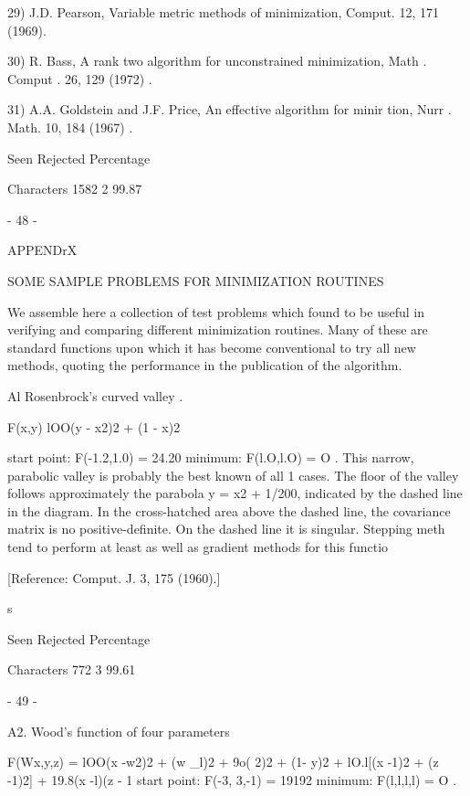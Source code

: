 29) J.D. Pearson, Variable metric methods of minimization, Comput.
        12, 171 (1969).
 
30) R. Bass, A rank two algorithm for unconstrained minimization,
        Math . Comput . 26, 129 (1972) .
 
31) A.A. Goldstein and J.F. Price, An effective algorithm for minir
        tion, Nurr . Math. 10, 184 (1967) .
 
                 Seen Rejected  Percentage
 
Characters       1582        2   99.87
 
                                - 48 -
 
 
APPENDrX
 
 
           SOME SAMPLE PROBLEMS FOR MINIMIZATION ROUTINES
 
 
     We assemble here a collection of test problems which found to be
useful in verifying and comparing different minimization routines.
Many of these are standard functions upon which it has become
conventional to try all new methods, quoting the performance in the
publication of the algorithm.
 
 
Al   Rosenbrock's curved valley
  .
 
 
                  F(x,y)  lOO(y - x2)2 + (1 - x)2
 
start point:              F(-1.2,1.0) = 24.20
minimum:                  F(l.O,l.O)  = O .
     This narrow, parabolic valley is probably the best known of all 1
cases.  The floor of the valley follows approximately the parabola
y = x2 + 1/200, indicated by the dashed line in the diagram.  In the
cross-hatched area above the dashed line, the covariance matrix is no
positive-definite.  On the dashed line it is singular.  Stepping meth
tend to perform at least as well as gradient methods for this functio
 
[Reference:  Comput. J. 3, 175 (1960).]
 
 
 
 
 
   s 
 
                 Seen Rejected  Percentage
 
Characters        772        3   99.61
 
                                - 49 -
 
 
A2.  Wood's function of four parameters
 
 
  F(Wx,y,z) = lOO(x -w2)2 + (w _l)2 + 9o(    2)2
               + (1- y)2 + lO.l[(x -1)2 + (z -1)2] + 19.8(x -l)(z - 1
start point:            F(-3,    3,-1) = 19192
minimum:                F(l,l,l,l)     = O .
 
